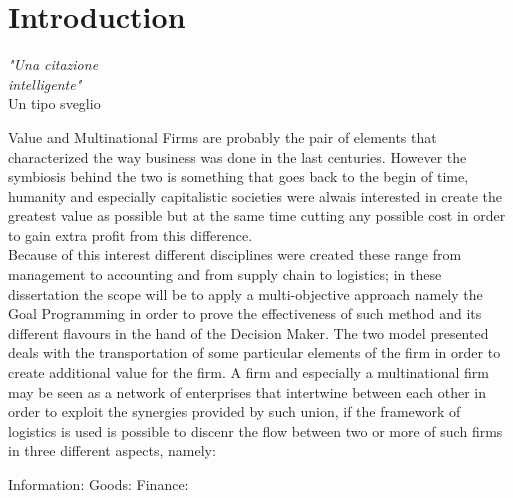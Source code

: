 \clearpage{\pagestyle{empty}\cleardoublepage}
\chapter*{Introduction}

\begin{flushright}\begin{small}\textit{"Una citazione \\ intelligente"}\\
Un tipo sveglio\\
\end{small}\end{flushright}
\begin{doublespace}
	Value and Multinational Firms are probably the pair of elements that characterized the way business was done in the last centuries. However the symbiosis behind the two is something that goes back to the begin of time, humanity and especially capitalistic societies were alwais interested in create the greatest value as possible but at the same time cutting any possible cost in order to gain extra profit from this difference.
\\
Because of this interest different disciplines were created these range from management to accounting and from supply chain to logistics; in these dissertation the scope will be to apply a multi-objective approach namely the Goal Programming in order to prove the effectiveness of such method and its different flavours in the hand of the Decision Maker. The two model presented deals with the transportation of some particular elements of the firm in order to create additional value for the firm. A firm and especially a multinational firm may be seen as a network of enterprises that intertwine between each other in order to exploit the synergies provided by such union, if the framework of logistics is used is possible to discenr the flow between two or more of such firms in three different aspects, namely:
\begin{itemize}
	\itemize Information:
	\itemize Goods:
	\itemize Finance:
\end{itemize}


\end{doublespace}
\clearpage{\pagestyle{empty}\cleardoublepage}
